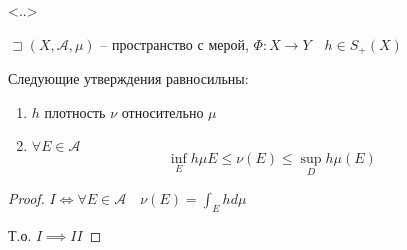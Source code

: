<..>

\begin{theorem}
    $\sqsupset \left( X, \mathscr A, \mu \right) $ -- пространство с мерой, $\Phi:X \to Y\quad h\in S_+(X)$ 

    Следующие утверждения равносильны: 
    \begin{enumerate}
        \item $h$ плотность  $\nu$ относительно  $\mu$
        \item $\forall E\in \mathscr A$ \[\inf_E h \mu E \leqslant \nu(E) \leqslant  \sup_D h\mu(E)\]
    \end{enumerate}
\end{theorem}
\begin{proof}
    $I \iff \forall E\in \mathscr A\quad \nu(E) = \int_E h d\mu$

    Т.о. $I \implies II$
\end{proof}
